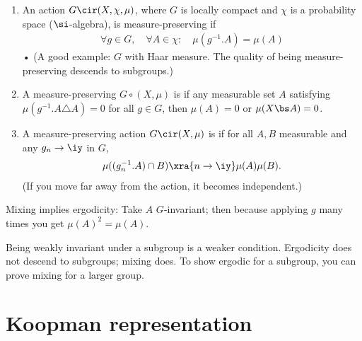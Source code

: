 \begin{df}
\begin{enumerate}
\item
An action $G\cir (X,\chi,\mu)$, where $G$ is locally compact and $\chi$ is a probability space ($\si$-algebra), is measure-preserving if %
\begin{align}
\forall g\in G, \quad \forall A\in \chi: \quad \mu(g^{-1}.A) = \mu(A)
\end{align}•
(A good example: $G$ with Haar measure. The quality of being measure-preserving descends to subgroups.)
\item
A measure-preserving $G\circ (X,\mu)$ is  if any measurable set $A$ satisfying $\mu(g^{-1}.A\triangle A)=0$ %
for all $g\in G$, then $\mu(A)=0$ or $\mu(X\bs A)=0$. 
\item
A measure-preserving action $G\cir (X,\mu)$ is  if for all $A,B$ measurable and any $g_n\to \iy$ in $G$, 
\begin{align}
\mu((g_n^{-1}.A)\cap B) \xra{n\to \iy} \mu(A)\mu(B).
\end{align}
(If you move far away from the action, it becomes independent.)
\end{enumerate}
\end{df}
Mixing implies ergodicity: 
Take $A$ $G$-invariant; then  because applying $g$ many times you get $\mu(A)^2=\mu(A)$. 

Being weakly invariant under a subgroup is a weaker condition. 
Ergodicity does not descend to subgroups; mixing does.
To show ergodic for a subgroup, you can prove mixing for a larger group. 
\section{Koopman representation}


